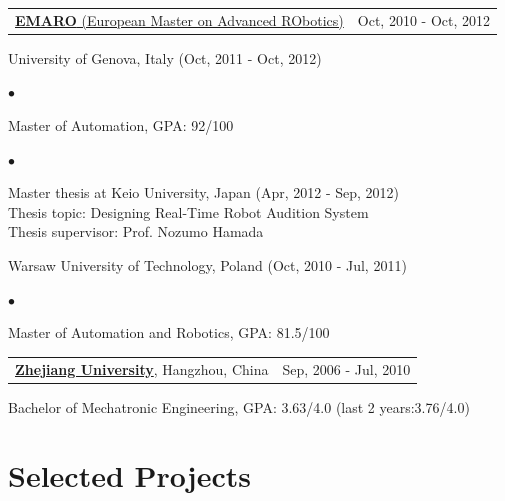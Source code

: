 \documentclass[margin,line]{res}
\newenvironment{list1}{
  \begin{list}{\ding{113}}{%
      \setlength{\itemsep}{0in}
      \setlength{\parsep}{0in} \setlength{\parskip}{0in}
      \setlength{\topsep}{0in} \setlength{\partopsep}{0in} 
      \setlength{\leftmargin}{0.17in}}}{\end{list}}
\newenvironment{list2}{
  \begin{list}{$\bullet$}{%
      \setlength{\itemsep}{0in}
      \setlength{\parsep}{0in} \setlength{\parskip}{0in}
      \setlength{\topsep}{0in} \setlength{\partopsep}{0in} 
      \setlength{\leftmargin}{0.2in}}}{\end{list}}
\begin{document}
\begin{resume}
\begin{tabularx}{\textwidth}{X r}
\href{http://emaro.irccyn.ec-nantes.fr/}{{\bf EMARO} (European Master on Advanced RObotics)} &Oct, 2010 - Oct, 2012\\
\end{tabularx}
\vspace*{-.1in}
\begin{list1}
\item[] University of Genova, Italy (Oct, 2011 - Oct, 2012)
\begin{list2}
\vspace*{.05in}
\item Master of Automation, GPA: 92/100
\end{list2}
\begin{list2}
\vspace*{.05in}
\item Master thesis at Keio University, Japan (Apr, 2012 - Sep, 2012)\\
Thesis topic: Designing Real-Time Robot Audition System\\
Thesis supervisor: Prof. Nozumo Hamada
\end{list2}
\end{list1}
\begin{list1}
\item[] Warsaw University of Technology, Poland (Oct, 2010 - Jul, 2011)
\begin{list2}
\vspace*{.05in}
\item Master of Automation and Robotics, GPA: 81.5/100
\end{list2}
\end{list1}

\begin{tabularx}{\textwidth}{X r}
\href{http://www.zju.edu.cn/english/}{{\bf Zhejiang University}}, Hangzhou, China   &Sep, 2006 - Jul, 2010\\
\end{tabularx}
\vspace*{-.1in}
\begin{list1}
\item[] Bachelor of Mechatronic Engineering, GPA: 3.63/4.0 (last 2 years:3.76/4.0)
\end{list1}



\section{\sc Selected Projects} 


\end{resume}
\end{document}
